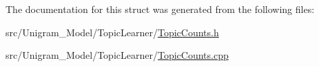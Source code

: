 The documentation for this struct was generated from the following files:\begin{DoxyCompactItemize}
\item 
src/Unigram\_\-Model/TopicLearner/\hyperlink{_topic_counts_8h}{TopicCounts.h}\item 
src/Unigram\_\-Model/TopicLearner/\hyperlink{_topic_counts_8cpp}{TopicCounts.cpp}\end{DoxyCompactItemize}
